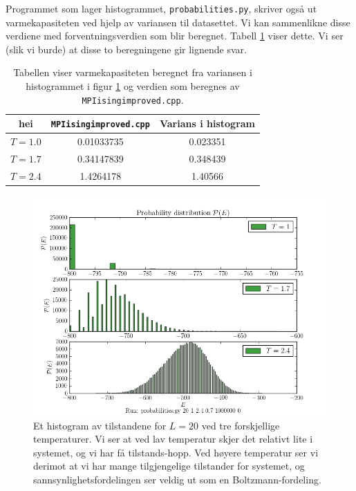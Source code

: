 \documentclass[11pt, twocolumn]{article}
\begin{document}
Programmet som lager histogrammet, \texttt{probabilities.py}, skriver
også ut varmekapasiteten ved hjelp av variansen til datasettet. Vi kan
sammenlikne disse verdiene med forventningsverdien som blir
beregnet. Tabell \ref{tab:var-vs-Cv} viser dette. Vi ser (slik vi
burde) at disse to beregningene gir lignende svar. 

\begin{table}
\centering
\caption{Tabellen viser varmekapasiteten beregnet fra variansen i
  histogrammet i figur \ref{fig:probabilities} og verdien som beregnes
av \texttt{MPIisingimproved.cpp}.}
\label{tab:var-vs-Cv}
\vspace{0.1cm}
\begin{tabular}{c|cc}
hei &\texttt{MPIisingimproved.cpp} & Varians i histogram\\
\hline
$T=1.0$ & 0.01033735  & 0.023351\\
$T=1.7$ & 0.34147839  & 0.348439 \\
$T=2.4$ & 1.4264178 & 1.40566
\end{tabular}
\end{table}

\begin{figure}[ht]
  \centering
  \includegraphics[scale=0.7]{../fig/prob_E.png}
  \caption{Et histogram av tilstandene for $L=20$ ved tre
forskjellige temperaturer. Vi ser at ved lav temperatur
skjer det relativt lite i systemet, og vi har få tilstands-hopp. Ved høyere temperatur ser vi derimot at vi har mange tilgjengelige tilstander for systemet, og 
sannsynlighetsfordelingen ser veldig ut som en Boltzmann-fordeling.}
\label{fig:probabilities}
\end{figure}
\end{document}
